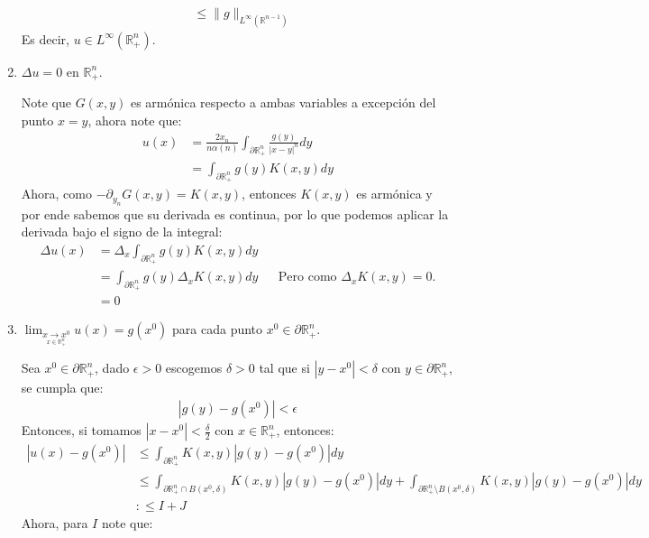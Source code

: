 \begin{homeworkProblem}
\begin{enumerate}
\begin{solucion}
\begin{align*}
        &\leq \|g\|_{L^{\infty}(\mathbb{R}^{n-1})}
      \end{align*}
      Es decir, $u\in L^{\infty}(\mathbb{R}^{n}_{+})$.
    \end{solucion}
    \item $\Delta u=0$ en $\mathbb{R}^{n}_{+}$.
    \begin{solucion}
      Note que $G(x,y)$ es armónica respecto a ambas variables a excepción del punto $x=y$, ahora note que:
      \begin{align*}
        u(x)&=\frac{2x_n}{n\alpha(n)}\int_{\partial \mathbb{R}^{n}_{+}}\frac{g(y)}{|x-y|^n}dy\\
        &=\int_{\partial \mathbb{R}^{n}_{+}}g(y)K(x,y)dy
      \end{align*}
      Ahora, como $-\partial_{y_n}G(x,y)=K(x,y)$, entonces $K(x,y)$ es armónica y por ende sabemos que su derivada es continua, por lo que podemos aplicar la derivada bajo el signo de la integral:
      \begin{align*}
        \Delta u(x)&=\Delta_x \int_{\partial \mathbb{R}^{n}_{+}}g(y)K(x,y)dy\\
        &=\int_{\partial \mathbb{R}^{n}_{+}}g(y)\Delta_x K(x,y)dy &&\text{Pero como $\Delta_x K(x,y)=0$.}\\
        &=0
      \end{align*}
    \end{solucion}
    \item $\lim_{\underset{x\in \mathbb{R}^{n}_{+}}{x\rightarrow x^0}}u(x)=g(x^0)$ para cada punto $x^0\in\partial \mathbb{R}^{n}_{+}$.
    \begin{solucion}
      Sea $x^0\in\partial \mathbb{R}^{n}_{+}$, dado $\epsilon > 0$ escogemos $\delta > 0$ tal que si $|y-x^0|<\delta$ con $y\in\partial \mathbb{R}^{n}_{+}$, se cumpla que:
      \begin{align*}
        |g(y)-g(x^0)|<\epsilon
      \end{align*}
      Entonces, si tomamos $|x-x^0|<\frac{\delta}{2}$ con $x\in\mathbb{R}^{n}_{+}$, entonces:
      \begin{align*}
        |u(x)-g(x^0)|&\leq \int_{\partial \mathbb{R}^{n}_{+}}K(x,y)|g(y)-g(x^0)|dy\\
        &\leq \int_{\partial \mathbb{R}^{n}_{+}\cap B(x^0,\delta)}K(x,y)|g(y)-g(x^0)|dy + \int_{\partial \mathbb{R}^{n}_{+}\setminus B(x^0,\delta)}K(x,y)|g(y)-g(x^0)|dy\\
        &:\leq I + J
      \end{align*}
      Ahora, para $I$ note que:

\end{solucion}
\end{enumerate}
\end{homeworkProblem}
